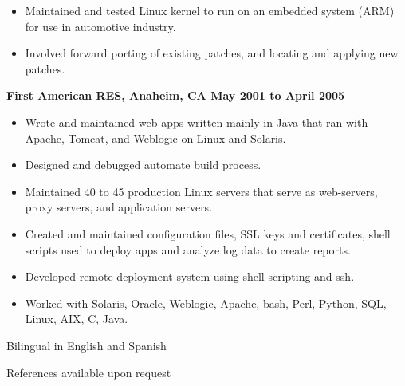 \documentclass{res}
\begin{document}
\begin{resume}
          \begin{itemize}

          \item
	    Maintained and tested Linux kernel to run on an embedded system
	    (ARM) for use in automotive industry.

          \item
	    Involved forward porting of existing patches, and locating and
	    applying new patches.

          \end{itemize}


          {\large \bf First American RES, Anaheim, CA \hfill May 2001 to April 2005}

          \begin{itemize}

          \item
	    Wrote and maintained web-apps written mainly in Java that ran
	    with Apache, Tomcat, and Weblogic on Linux and Solaris.
          \item
	    Designed and debugged automate build process.
          \item
	    Maintained 40 to 45 production Linux servers that serve as
	    web-servers, proxy servers, and application servers.
          \item
	    Created and maintained configuration files, SSL keys and
	    certificates, shell scripts used to deploy apps and analyze log
	    data to create reports.

          \item
	    Developed remote deployment system using shell scripting and ssh.

          \item
	    Worked with Solaris, Oracle, Weblogic, Apache, bash, Perl,
	    Python, SQL, Linux, AIX, C, Java.

          \end{itemize}

          Bilingual in English and Spanish

          References available upon request

\end{resume}
\end{document}
